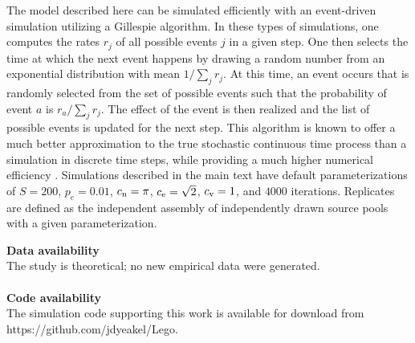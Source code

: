 \documentclass[twocolumn,preprintnumbers,amsmath,amssymb,superscriptaddress,linenumbers]{revtex4-1}
\begin{document}
{  The model described here can be simulated efficiently with an event-driven simulation utilizing a Gillespie algorithm.
  In these types of simulations, one computes the rates $r_j$ of all possible events $j$ in a given step.
  One then selects the time at which the next event happens by drawing a random number from an exponential distribution with mean $1/\sum_j{r_j}$.
  At this time, an event occurs that is randomly selected from the set of possible events such that the probability of event $a$ is $r_a/\sum_j{r_j}$.
  The effect of the event is then realized and the list of possible events is updated for the next step.
  This algorithm is known to offer a much better approximation to the true stochastic continuous time process than a simulation in discrete time steps, while providing a much higher numerical efficiency \cite{Gillespie1977}.
  Simulations described in the main text have default parameterizations of $S=200$, $p_e=0.01$, $c_{\rm n} = \pi$, $c_{\rm e} = \sqrt{2}$, $c_{\rm v} = 1$, and $4000$ iterations.
  Replicates are defined as the independent assembly of independently drawn source pools with a given parameterization.}

\vspace{2mm}
\noindent \textbf{Data availability}\\
  \footnotesize{
  The study is theoretical; no new empirical data were generated.
  }\\ \\
\noindent \textbf{Code availability}\\
  \footnotesize{
  The simulation code supporting this work is available for download from https://github.com/jdyeakel/Lego.
  }\\
\end{document}
